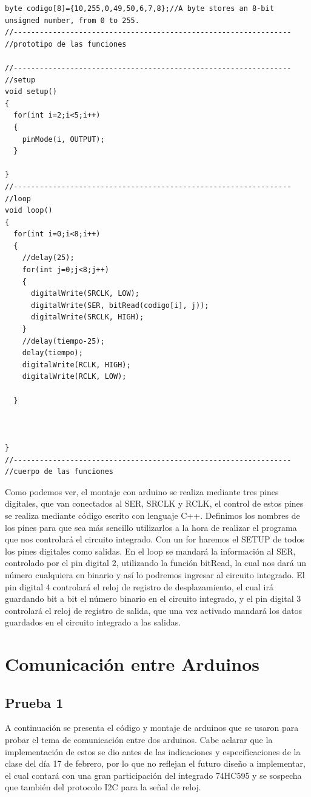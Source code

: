 \documentclass{article}
\begin{document}
\begin{itemize}
\begin{lstlisting}[style=myArduino]
byte codigo[8]={10,255,0,49,50,6,7,8};//A byte stores an 8-bit unsigned number, from 0 to 255.
//----------------------------------------------------------------
//prototipo de las funciones

//----------------------------------------------------------------
//setup
void setup()
{
  for(int i=2;i<5;i++)
  {
    pinMode(i, OUTPUT);
  }
  
}
//----------------------------------------------------------------
//loop
void loop()
{
  for(int i=0;i<8;i++)
  {
  	//delay(25);
    for(int j=0;j<8;j++)
    {
      digitalWrite(SRCLK, LOW);
      digitalWrite(SER, bitRead(codigo[i], j));
      digitalWrite(SRCLK, HIGH);
    }
    //delay(tiempo-25);
    delay(tiempo);
    digitalWrite(RCLK, HIGH);
    digitalWrite(RCLK, LOW);
    
  }
  
  
  
}
//----------------------------------------------------------------
//cuerpo de las funciones
\end{lstlisting}

Como podemos ver, el montaje con arduino se realiza mediante tres pines digitales, que van conectados al SER, SRCLK y RCLK, el control de estos pines se realiza mediante código escrito con lenguaje C++.
Definimos los nombres de los pines para que sea más sencillo utilizarlos a la hora de realizar el programa que nos controlará el circuito integrado. Con un for haremos el SETUP de todos los pines digitales como salidas. En el loop se mandará la información al SER, controlado por el pin digital 2, utilizando la función bitRead, la cual nos dará un número cualquiera en binario y así lo podremos ingresar al circuito integrado. El pin digital 4 controlará el reloj de registro de desplazamiento, el cual irá guardando bit a bit el número binario en el circuito integrado, y el pin digital 3 controlará el reloj de registro de salida, que una vez activado mandará los datos guardados en el circuito integrado a las salidas.

\end{itemize}


\vspace{0.5cm}
\noindent


\section{Comunicación entre Arduinos} \label{Comunicación entre Arduinos}
\subsection{Prueba 1}\label{intento1}
A continuación se presenta el código y montaje de arduinos que se usaron para probar el tema de comunicación entre dos arduinos. Cabe aclarar que la implementación de estos se dio antes de las indicaciones y especificaciones de la clase del día 17 de febrero, por lo que no reflejan el futuro diseño a implementar, el cual contará con una gran participación del integrado 74HC595 y se sospecha que también del protocolo I2C para la señal de reloj.
\end{document}

